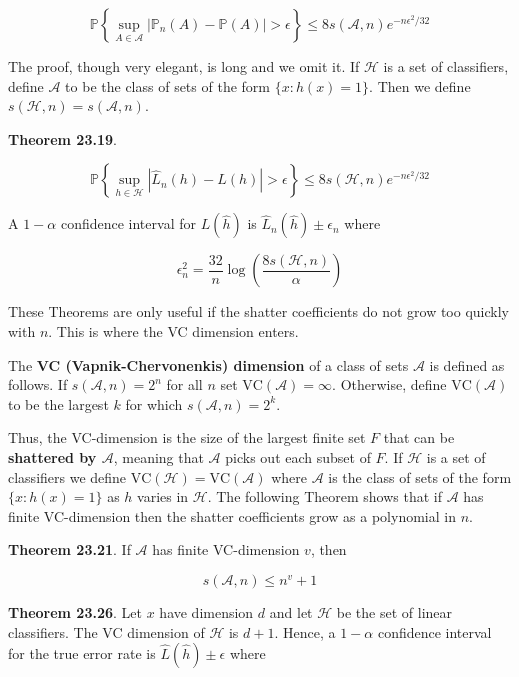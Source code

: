 \[ \mathbb{P} \left\{ \sup_{A \in \mathcal{A}} | \mathbb{P}_{n}(A) - \mathbb{P}(A) | > \epsilon \right\} \leq 8 s(\mathcal{A}, n) e^{-n \epsilon^{2} / 32} \]

The proof, though very elegant, is long and we omit it. If
\(\mathcal{H}\) is a set of classifiers, define \(\mathcal{A}\) to be
the class of sets of the form \(\{ x : h(x) = 1 \}\). Then we define
\(s(\mathcal{H}, n) = s(\mathcal{A}, n)\).

\textbf{Theorem 23.19}.

\[ \mathbb{P} \left\{ \sup_{h \in \mathcal{H}} | \hat{L}_{n}(h) - L(h) | > \epsilon \right\} \leq 8 s(\mathcal{H}, n) e^{-n \epsilon^{2} / 32} \]

A \(1 - \alpha\) confidence interval for \(L(\hat{h})\) is
\(\hat{L}_{n}(\hat{h}) \pm \epsilon_{n}\) where

\[ \epsilon_{n}^{2} = \frac{32}{n} \log \left( \frac{8 s(\mathcal{H}, n)}{\alpha} \right) \]

These Theorems are only useful if the shatter coefficients do not grow
too quickly with \(n\). This is where the VC dimension enters.

The \textbf{VC (Vapnik-Chervonenkis) dimension} of a class of sets
\(\mathcal{A}\) is defined as follows. If \(s(\mathcal{A}, n) = 2^{n}\)
for all \(n\) set \(\text{VC}(\mathcal{A}) = \infty\). Otherwise, define
\(\text{VC}(\mathcal{A})\) to be the largest \(k\) for which
\(s(\mathcal{A}, n) = 2^{k}\).

Thus, the VC-dimension is the size of the largest finite set \(F\) that
can be \textbf{shattered by \(\mathcal{A}\)}, meaning that
\(\mathcal{A}\) picks out each subset of \(F\). If \(\mathcal{H}\) is a
set of classifiers we define
\(\text{VC}(\mathcal{H}) = \text{VC}(\mathcal{A})\) where
\(\mathcal{A}\) is the class of sets of the form \(\{ x : h(x) = 1 \}\)
as \(h\) varies in \(\mathcal{H}\). The following Theorem shows that if
\(\mathcal{A}\) has finite VC-dimension then the shatter coefficients
grow as a polynomial in \(n\).

\textbf{Theorem 23.21}. If \(\mathcal{A}\) has finite VC-dimension
\(v\), then

\[ s(\mathcal{A}, n) \leq n^v + 1 \]

\textbf{Theorem 23.26}. Let \(x\) have dimension \(d\) and let
\(\mathcal{H}\) be the set of linear classifiers. The VC dimension of
\(\mathcal{H}\) is \(d + 1\). Hence, a \(1 - \alpha\) confidence
interval for the true error rate is \(\hat{L}(\hat{h}) \pm \epsilon\)
where

